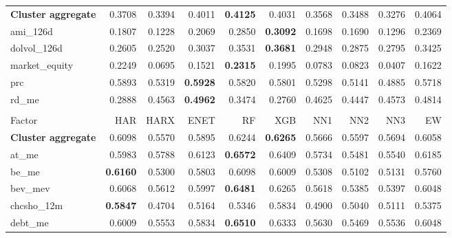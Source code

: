 \begin{longtable}{>{\raggedright\arraybackslash}p{2.6cm}rrrrrrrrr}
\hline
\textbf{Cluster aggregate} & 0.3708 & 0.3394 & \cellcolor{blue!10}0.4011 & \textbf{\cellcolor{blue!10}0.4125} & \cellcolor{blue!10}0.4031 & 0.3568 & 0.3488 & 0.3276 & \cellcolor{blue!10}0.4064 \\
ami\_126d & 0.1807 & 0.1228 & \cellcolor{blue!10}0.2069 & \cellcolor{blue!10}0.2850 & \textbf{\cellcolor{blue!10}0.3092} & 0.1698 & 0.1690 & 0.1296 & \cellcolor{blue!10}0.2369 \\
dolvol\_126d & 0.2605 & 0.2520 & \cellcolor{blue!10}0.3037 & \cellcolor{blue!10}0.3531 & \textbf{\cellcolor{blue!10}0.3681} & \cellcolor{blue!10}0.2948 & \cellcolor{blue!10}0.2875 & \cellcolor{blue!10}0.2795 & \cellcolor{blue!10}0.3425 \\
market\_equity & 0.2249 & 0.0695 & 0.1521 & \textbf{\cellcolor{blue!10}0.2315} & 0.1995 & 0.0783 & 0.0823 & 0.0407 & 0.1622 \\
prc & 0.5893 & 0.5319 & \textbf{\cellcolor{blue!10}0.5928} & 0.5820 & 0.5801 & 0.5298 & 0.5141 & 0.4885 & 0.5718 \\
rd\_me & 0.2888 & \cellcolor{blue!10}0.4563 & \textbf{\cellcolor{blue!10}0.4962} & \cellcolor{blue!10}0.3474 & 0.2760 & \cellcolor{blue!10}0.4625 & \cellcolor{blue!10}0.4447 & \cellcolor{blue!10}0.4573 & \cellcolor{blue!10}0.4814 \\
\hline
\multicolumn{10}{@{}l}{\textit{Panel M. Value}} \\
\hline
Factor & HAR & HARX & ENET & RF & XGB & NN1 & NN2 & NN3 & EW \\
\hline
\textbf{Cluster aggregate} & 0.6098 & 0.5570 & 0.5895 & \cellcolor{blue!10}0.6244 & \textbf{\cellcolor{blue!10}0.6265} & 0.5666 & 0.5597 & 0.5694 & 0.6058 \\
at\_me & 0.5983 & 0.5788 & \cellcolor{blue!10}0.6123 & \textbf{\cellcolor{blue!10}0.6572} & \cellcolor{blue!10}0.6409 & 0.5734 & 0.5481 & 0.5540 & \cellcolor{blue!10}0.6185 \\
be\_me & \textbf{0.6160} & 0.5300 & 0.5803 & 0.6098 & 0.6009 & 0.5308 & 0.5102 & 0.5131 & 0.5760 \\
bev\_mev & 0.6068 & 0.5612 & 0.5997 & \textbf{\cellcolor{blue!10}0.6481} & \cellcolor{blue!10}0.6265 & 0.5618 & 0.5385 & 0.5397 & 0.6048 \\
chcsho\_12m & \textbf{0.5847} & 0.4704 & 0.5164 & 0.5346 & 0.5834 & 0.4900 & 0.5040 & 0.5111 & 0.5375 \\
debt\_me & 0.6009 & 0.5553 & 0.5834 & \textbf{\cellcolor{blue!10}0.6510} & \cellcolor{blue!10}0.6333 & 0.5630 & 0.5469 & 0.5536 & \cellcolor{blue!10}0.6048 \\

\end{longtable}
